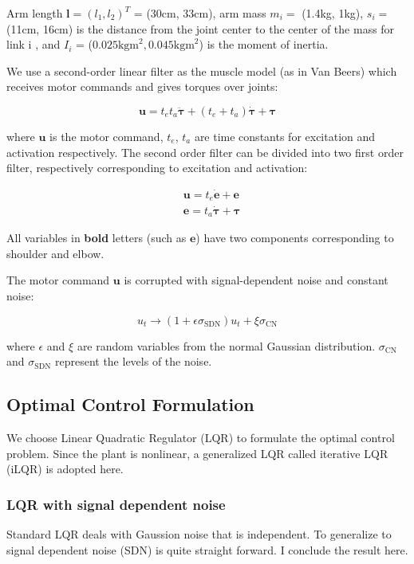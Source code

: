 Arm length $\bm{l} = (l_1, l_2)^T$ = (30cm, 33cm), arm mass $m_i =$ (1.4kg, 1kg), $s_i=$ (11cm, 16cm) is the distance from the joint center to the center of the mass for link i , and $I_i$ = ($0.025\text{kgm}^2, 0.045\text{kgm}^2$) is the moment of inertia.

We use a second-order linear filter as the muscle model (as in Van Beers) which receives motor commands and gives torques over joints:

\begin{equation}
\bm{u} = t_et_a\ddot{\bm{\tau}} + (t_e+t_a)\dot{\bm{\tau}} +\bm{\tau}
\end{equation}

where $\bm{u}$ is the motor command, $t_e$, $t_a$ are time constants for excitation and activation respectively. 
The second order filter can be divided into two first order filter, respectively corresponding to excitation and activation:

\begin{equation}
\begin{split}
& \bm{u} = t_e \dot{\bm{e}} + \bm{e} \\
& \bm{e} = t_a \dot{\bm{\tau}} + \bm{\tau}
\end{split}
\end{equation}

All variables in \textbf{bold} letters (such as $\bm{e}$) have two components corresponding to shoulder and elbow.

The motor command $\bm{u}$ is corrupted with signal-dependent noise and constant noise:

\begin{equation}
u_t \rightarrow (1 + \epsilon\sigma_{\text{SDN}}) u_t + \xi\sigma_{\text{CN}}
\end{equation}

where $\epsilon$ and $\xi$ are random variables from the normal Gaussian distribution.
$\sigma_{\text{CN}}$ and $\sigma_{\text{SDN}}$ represent the levels of the noise.

\subsection{Optimal Control Formulation}
\label{ocformulation}

We choose Linear Quadratic Regulator (LQR) \cite{todorov2006optimal} to formulate the optimal control problem. Since the plant is nonlinear, a generalized LQR called iterative LQR (iLQR) is adopted here.

\subsubsection{LQR with signal dependent noise}
Standard LQR deals with Gaussion noise that is independent. To generalize to signal dependent noise (SDN) is quite straight forward. I conclude the result here.

